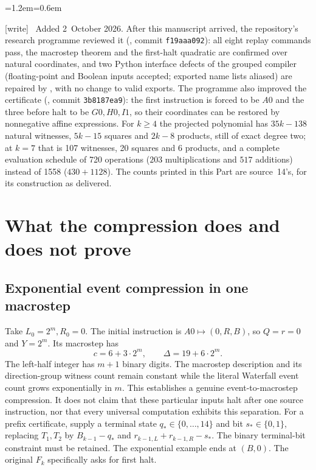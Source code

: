 \documentclass[11pt,letterpaper]{article}
\theoremstyle{definition}
\theoremstyle{remark}
\newcommand{\wtag}{\textup{[write]}}
\newenvironment{writenote}{\par\smallskip\begin{list}{}{\leftmargin=1.2em\rightmargin=0.6em}\item[]\small\wtag\ }{\end{list}\smallskip}
\begin{document}
\begin{writenote}
Added 2~October 2026. After this manuscript arrived, the repository's research programme reviewed it (, commit \texttt{f19aaa092}): all eight replay commands pass, the macrostep theorem and the first-halt quadratic are confirmed over natural coordinates, and two Python interface defects of the grouped compiler (floating-point and Boolean inputs accepted; exported name lists aliased) are repaired by , with no change to valid exports. The programme also improved the certificate (, commit \texttt{3b8187ea9}): the first instruction is forced to be $A0$ and the three before halt to be $G0,H0,I1$, so their coordinates can be restored by nonnegative affine expressions. For $k\ge4$ the projected polynomial has $35k-138$ natural witnesses, $5k-15$ squares and $2k-8$ products, still of exact degree two; at $k=7$ that is 107 witnesses, 20 squares and 6 products, and a complete evaluation schedule of 720 operations ($203$ multiplications and $517$ additions) instead of 1558 ($430+1128$). The counts printed in this Part are source~14's, for its construction as delivered.
\end{writenote}

\section{What the compression does and does not prove}\label{qoc:wf:sec:scope}
\subsection{Exponential event compression in one macrostep}
Take $L_0=2^m,R_0=0$. The initial instruction is $A0\mapsto(0,R,B)$, so $Q=r=0$ and $Y=2^m$. Its macrostep has
\[
 c=6+3\cdot2^m,\qquad \Delta=19+6\cdot2^m.
\]
The left-half integer has $m+1$ binary digits. The macrostep description and its direction-group witness count remain constant while the literal Waterfall event count grows exponentially in $m$. This establishes a genuine event-to-macrostep compression. It does not claim that these particular inputs halt after one source instruction, nor that every universal computation exhibits this separation. For a prefix certificate, supply a terminal state $q_*\in\{0,\ldots,14\}$ and bit $s_*\in\{0,1\}$, replacing $T_1,T_2$ by $B_{k-1}-q_*$ and $r_{k-1,L}+r_{k-1,R}-s_*$. The binary terminal-bit constraint must be retained. The exponential example ends at $(B,0)$. The original $F_k$ specifically asks for first halt.
\end{document}
